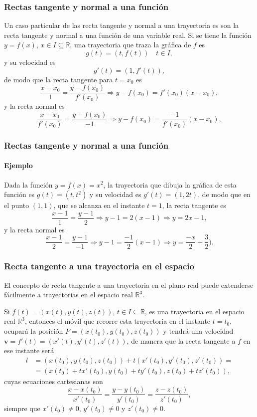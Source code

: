 \begin{frame}
\frametitle{Rectas tangente y normal a una función}
Un caso particular de las recta tangente y normal a una trayectoria es son la recta tangente y normal a una función de una variable real. 
Si se tiene la función $y=f(x)$, $x\in I\subseteq \mathbb{R}$, una trayectoria que traza la gráfica de $f$ es 
\[
g(t) = (t,f(t))  \quad t\in I,
\]
y su velocidad es
\[
g'(t) = (1,f'(t)),
\]
de modo que la recta tangente para $t=x_0$ es
\[
\frac{x-x_0}{1} = \frac{y-f(x_0)}{f'(x_0)} \Rightarrow y-f(x_0) = f'(x_0)(x-x_0),
\]  
y la recta normal es 
\[
\frac{x-x_0}{f'(x_0)} = \frac{y-f(x_0)}{-1} \Rightarrow y-f(x_0) = \frac{-1}{f'(x_0)}(x-x_0),
\]
\end{frame}


\begin{frame}
\frametitle{Rectas tangente y normal a una función}
\framesubtitle{Ejemplo}
Dada la función $y=f(x)=x^2$, la trayectoria que dibuja la gráfica de esta función es $g(t)=(t,t^2)$ y su velocidad es
$g'(t)=(1,2t)$, de modo que en el punto $(1,1)$, que se alcanza en el instante $t=1$, la recta tangente es
\[
\frac{x-1}{1} = \frac{y-1}{2} \Rightarrow y-1 = 2(x-1) \Rightarrow y = 2x-1,
\]  
y la recta normal es 
\[
\frac{x-1}{2} = \frac{y-1}{-1} \Rightarrow y-1 = \frac{-1}{2}(x-1) \Rightarrow y = \frac{-x}{2}+\frac{3}{2}).
\]
\begin{center}
\scalebox{0.8}{}
\end{center} 
\end{frame}


\begin{frame}
\frametitle{Recta tangente a una trayectoria en el espacio}
El concepto de recta tangente a una trayectoria en el plano real puede extenderse fácilmente a trayectorias en el espacio real $\mathbb{R}^3$.

Si $f(t)=(x(t),y(t),z(t))$, $t\in I\subseteq \mathbb{R}$, es una trayectoria en el espacio real $\mathbb{R}^3$, entonces
el móvil que recorre esta trayectoria en el instante $t=t_0$, ocupará la posición $P=(x(t_0),y(t_0),z(t_0))$ y tendrá una velocidad $\mathbf{v}=f'(t)=(x'(t),y'(t),z'(t))$, de manera que la recta tangente a $f$ en ese instante será
\begin{align*}
l&=(x(t_0),y(t_0),z(t_0))+t(x'(t_0),y'(t_0),z'(t_0)) =\\
&= (x(t_0)+tx'(t_0),y(t_0)+ty'(t_0),z(t_0)+tz'(t_0)),
\end{align*}
cuyas ecuaciones cartesianas son 
\[
\frac{x-x(t_0)}{x'(t_0)}=\frac{y-y(t_0)}{y'(t_0)}=\frac{z-z(t_0)}{z'(t_0)},
\]
siempre que $x'(t_0)\neq 0$, $y'(t_0)\neq 0$ y $z'(t_0)\neq 0$.
\end{frame}


